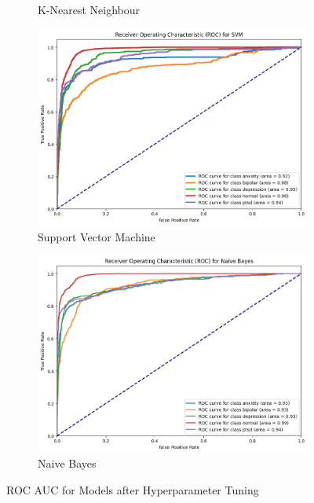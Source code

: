 \begin{figure}[H]
\begin{subfigure}[b]{0.49\textwidth}
        \caption{K-Nearest Neighbour}
        \label{LSTMROC5}  %
    \end{subfigure}
    \hfill
    \begin{subfigure}[b]{0.49\textwidth}
        \centering
        \includegraphics[width=\textwidth]{Images/HP SVM ROC.png}
        \caption{Support Vector Machine}
        \label{LSTMROC}  %
    \end{subfigure}
    \hfill
    \begin{subfigure}[b]{0.49\textwidth}
        \centering
        \includegraphics[width=\textwidth]{Images/HP NB ROC.png}
        \caption{Naive Bayes}
        \label{LSTMROC8}  %
    \end{subfigure}
    \label{fig:hp_lr_comparison}
    \caption{ROC AUC for Models after Hyperparameter Tuning}
\end{figure}

